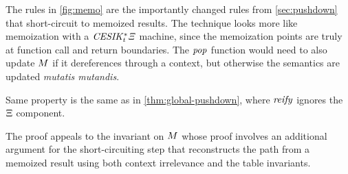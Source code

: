 The rules in \autoref{fig:memo} are the importantly changed rules from \autoref{sec:pushdown} that short-circuit to memoized results.
%
The technique looks more like memoization with a $\mathit{CESIK^*_t\Xi}$ machine, since the memoization points are truly at function call and return boundaries.
%
The $\mathit{pop}$ function would need to also update $M$ if it dereferences through a context, but otherwise the semantics are updated \emph{mutatis mutandis}.

\begin{theorem}[Correctness]
Same property is the same as in \autoref{thm:global-pushdown}, where $\mathit{reify}$ ignores the $\Xi$ component.
\end{theorem}
The proof appeals to the invariant on $M$ whose proof involves an additional argument for the short-circuiting step that reconstructs the path from a memoized result using both context irrelevance and the table invariants.
